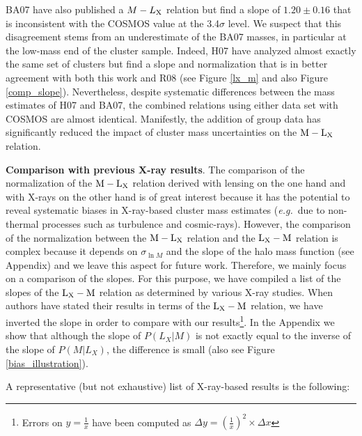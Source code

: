 \documentclass[12pt]{emulateapj}
\newcommand{\mlx}{$\rm{M} - \rm{L}_{\rm X}$ }
\newcommand{\lxm}{$\rm{L}_{\rm X} - \rm{M}$ }
\newcommand{\eg}{{\it e.g.}}
\begin{document}
BA07 have also published a $M-L_{\rm X}$ relation but find a slope of
$1.20 \pm 0.16$ that is inconsistent with the COSMOS value at the
3.4$\sigma$ level. We suspect that this disagreement stems from an
underestimate of the BA07 masses, in particular at the low-mass end of
the cluster sample. Indeed, H07 have analyzed almost exactly the same
set of clusters but find a slope and normalization that is in better
agreement with both this work and R08 (see Figure \ref{lx_m} and also
Figure \ref{comp_slope}). Nevertheless, despite systematic differences
between the mass estimates of H07 and BA07, the combined relations
using either data set with COSMOS are almost identical. Manifestly,
the addition of group data has significantly reduced the impact of
cluster mass uncertainties on the \mlx relation. \vspace{0.05 in}

{\bf Comparison with previous X-ray results}. The comparison of the
normalization of the \mlx relation derived with lensing on the one
hand and with X-rays on the other hand is of great interest because it
has the potential to reveal systematic biases in X-ray-based cluster
mass estimates (\eg\ due to non-thermal processes such as turbulence
and cosmic-rays). However, the comparison of the normalization between
the \mlx relation and the \lxm relation is complex because it depends
on $\sigma_{\ln M}$ and the slope of the halo mass function (see
Appendix) and we leave this aspect for future work. Therefore, we
mainly focus on a comparison of the slopes. For this purpose, we have
compiled a list of the slopes of the \lxm relation as determined by
various X-ray studies. When authors have stated their results in terms
of the \lxm relation, we have inverted the slope in order to compare
with our results\footnote[8]{Errors on $y=\frac{1}{x}$ have been
  computed as $\Delta y = \left( \frac{1}{x} \right)^2 \times \Delta
  x$}. In the Appendix we show that although the slope of $P(L_{X}|M)$
is not exactly equal to the inverse of the slope of $P(M|L_{X})$, the
difference is small (also see Figure \ref{bias_illustration}).

A representative (but not exhaustive) list of X-ray-based results is
the following:
\end{document}
